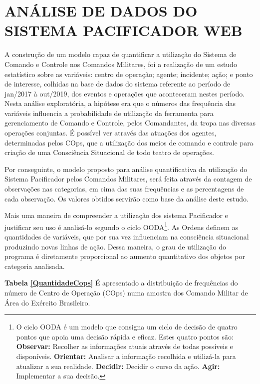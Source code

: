 \chapter{ANÁLISE DE DADOS DO SISTEMA PACIFICADOR WEB}
A construção de um modelo capaz de quantificar a utilização do Sistema de Comando e Controle nos Comandos Militares, foi a realização de um estudo estatístico sobre as variáveis: centro de operação; agente; incidente; ação; e ponto de interesse, colhidas na base de dados do sistema referente ao período de jan/2017 à out/2019, dos eventos e operações que aconteceram nestes período. Nesta análise exploratória, a hipótese era que o números das frequência das variáveis influencia a probabilidade de utilização da ferramenta para gerenciamento de Comando e Controle, pelos Comandantes, da tropa nas diversas operações conjuntas. É possível ver através das atuações dos agentes, determinadas pelos COps, que a utilização dos meios de comando e controle para criação de uma Consciência Situacional de todo teatro de operações. 

Por conseguinte, o modelo proposto para análise quantificativa da utilização do Sistema Pacificador pelos Comandos Militares, será feita através da contagem de observações nas categorias, em cima das suas frequências e as percentagens de cada observação. Os valores obtidos servirão como base da análise deste estudo. 


Mais uma maneira de compreender a utilização dos sistema Pacificador e justificar seu uso é analisá-lo segundo o ciclo OODA\footnote{O ciclo OODA é um modelo que consigna um ciclo de decisão de quatro pontos que apoia uma decisão rápida e eficaz. Estes quatro pontos são: \textbf{Observar: }Recolher as informações atuais através de todas possíveis e disponíveis. \textbf{Orientar: }Analisar a informação recolhida e utilizá-la para atualizar a sua realidade. \textbf{Decidir: }Decidir o curso da ação. \textbf{Agir: }Implementar a sua decisão.}. As Ordens definem as quantidades de variáveis, que por sua vez influenciam na consciência situacional produzindo novas linhas de ação. Dessa maneira, o grau de utilização do programa é diretamente proporcional ao aumento quantitativo dos objetos por categoria analisada.

\textbf{Tabela \ref{QuantidadeCops}} É apresentado a distribuição de frequências do número de Centro de Operação (COps) numa amostra dos Comando Militar de Área do Exército Brasileiro. 

